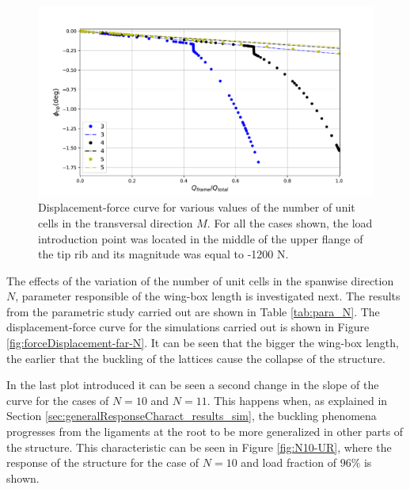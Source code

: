     \begin{figure}[!htpb] %
      \centering
      \includegraphics[width=0.8 \textwidth]{../figures/result-sim/M/force_displacement-far-1200N}
      \caption[Displacement-force curve for various values of the number of unit cells in the transversal direction]{Displacement-force curve for various values of the number of unit cells in the transversal direction $M$. For all the cases shown, the load introduction point was located in the middle of the upper flange of the tip rib and its magnitude was equal to -1200 N.}\label{fig:forceDisplacement-far-M}
    \end{figure}

    The effects of the variation of the number of unit cells in the spanwise direction $N$, parameter responsible of the wing-box length is investigated next. The results from the parametric study carried out are shown in Table \ref{tab:para_N}. The displacement-force curve for the simulations carried out is shown in Figure \ref{fig:forceDisplacement-far-N}. It can be seen that the bigger the wing-box length, the earlier that the buckling of the lattices cause the collapse of the structure.

    In the last plot introduced it can be seen a second change in the slope of the curve for the cases of $N = 10$ and $N = 11$. This happens when, as explained in Section \ref{sec:generalResponseCharact_results_sim}, the buckling phenomena progresses from the ligaments at the root to be more generalized in other parts of the structure. This characteristic can be seen in Figure \ref{fig:N10-UR}, where the response of the structure for the case of $N = 10$ and load fraction of $96\%$ is shown.

